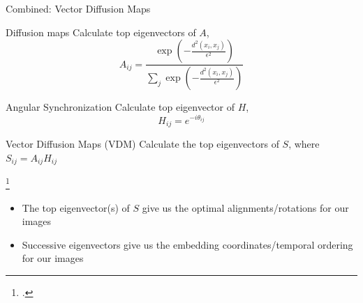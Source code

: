 \documentclass[10pt,aspectratio=169]{beamer}
\begin{document}
%
%
%
%
%
%
%
%
%

\begin{frame}{Combined: Vector Diffusion Maps}

\begin{minipage}{0.45\textwidth}
	\begin{block}{Diffusion maps}
		Calculate top eigenvectors of $A$, 
		$$A_{ij} = \frac{\exp \left(-\frac{d^2(x_i, x_j)}{\epsilon^2}\right)}{\sum_j \exp \left(-\frac{d^2(x_i, x_j)}{\epsilon^2}\right)} $$
	\end{block}
	\end{minipage}	
	\hfill
	\begin{minipage}{0.45\textwidth}	
	\begin{block}{Angular Synchronization}
		Calculate top eigenvector of $H$,  
		$$H_{ij} = e^{-i \theta_{ij}}$$
	\end{block}
	\end{minipage}
	
	\begin{block}{Vector Diffusion Maps (VDM) \footnotemark} 
		Calculate the top eigenvectors of $S$, where $S_{ij} = A_{ij}H_{ij}$
		
	\end{block}
	\footcitetext{singer2012vector}

\begin{itemize}
\item The top eigenvector(s) of $S$ give us the optimal alignments/rotations for our images
\item Successive eigenvectors give us the embedding coordinates/temporal ordering for our images
\end{itemize}

\end{frame}
\end{document}
